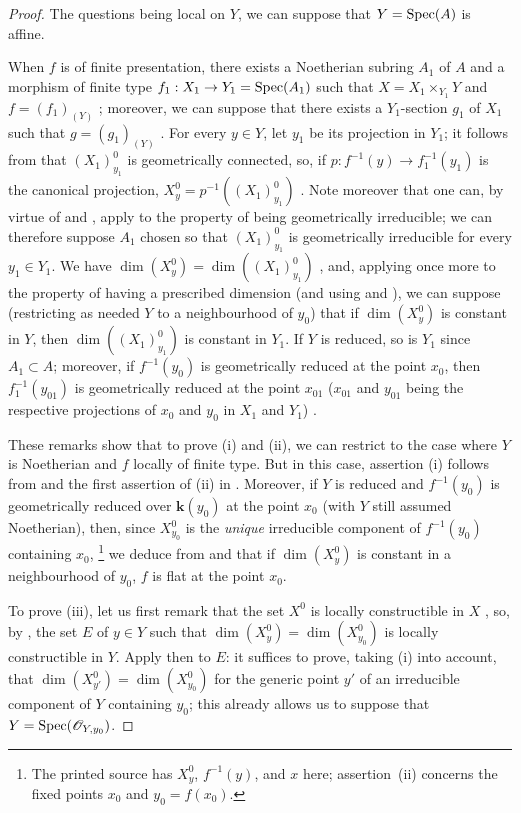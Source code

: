 \begin{proof}
The questions being local on $Y$, we can suppose that $Y=\operatorname{Spec}(A)$ is affine.

When $f$ is of finite presentation, there exists a Noetherian subring $A_1$ of $A$ and a morphism of finite type $f_1:X_1\to Y_1=\operatorname{Spec}(A_1)$ such that $X=X_1\times_{Y_1}Y$ and $f=(f_1)_{(Y)}$ ; moreover, we can suppose that there exists a $Y_1$-section $g_1$ of $X_1$ such that $g=(g_1)_{(Y)}$ .
For every $y\in Y$, let $y_1$ be its projection in $Y_1$; it follows from  that $(X_1)_{y_1}^0$ is geometrically connected, so, if $p:f^{-1}(y)\to f_1^{-1}(y_1)$ is the canonical projection, $X_y^0=p^{-1}((X_1)_{y_1}^0)$ .
Note moreover that one can, by virtue of  and , apply  to the property of being geometrically irreducible; we can therefore suppose $A_1$ chosen so that $(X_1)_{y_1}^0$ is geometrically irreducible for every $y_1\in Y_1$.
We have $\dim(X_y^0)=\dim((X_1)_{y_1}^0)$ , and, applying  once more to the property of having a prescribed dimension (and using  and ), we can suppose (restricting as needed $Y$ to a neighbourhood of $y_0$) that if $\dim(X_y^0)$ is constant in $Y$, then $\dim((X_1)_{y_1}^0)$ is constant in $Y_1$.
If $Y$ is reduced, so is $Y_1$ since $A_1\subset A$; moreover, if $f^{-1}(y_0)$ is geometrically reduced at the point $x_0$, then $f_1^{-1}(y_{01})$ is geometrically reduced at the point $x_{01}$ ($x_{01}$ and $y_{01}$ being the respective projections of $x_0$ and $y_0$ in $X_1$ and $Y_1$) .

These remarks show that to prove (i) and (ii), we can restrict to the case where $Y$ is Noetherian and $f$ locally of finite type.
But in this case, assertion (i) follows from  and the first assertion of (ii) in .
Moreover, if $Y$ is reduced and $f^{-1}(y_0)$ is geometrically reduced over $\boldsymbol{k}(y_0)$ at the point $x_0$ (with $Y$ still assumed
Noetherian), then, since $X_{y_0}^0$ is the \emph{unique} irreducible component of $f^{-1}(y_0)$ containing $x_0$,
\footnote{The printed source has $X_y^0$, $f^{-1}(y)$, and $x$ here; assertion~(ii) concerns the fixed points $x_0$ and $y_0=f(x_0)$.}
we deduce from  and  that if $\dim(X_y^0)$ is constant in a neighbourhood of $y_0$, $f$ is flat at the point $x_0$.

To prove (iii), let us first remark that the set $X^0$ is locally constructible in $X$ , so, by , the set $E$ of $y\in Y$ such that $\dim(X_y^0)=\dim(X_{y_0}^0)$ is locally constructible in $Y$.
Apply then  to $E$: it suffices to prove, taking (i) into account, that $\dim(X_{y'}^0)=\dim(X_{y_0}^0)$ for the generic point $y'$ of an irreducible component of $Y$ containing $y_0$; this already allows us to suppose that $Y=\operatorname{Spec}(\mathscr{O}_{Y,y_0})$.


\end{proof}
